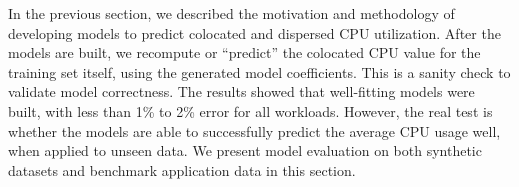 


In the previous section, we described the motivation and methodology
of developing models to predict colocated and 
dispersed CPU utilization.
After the models are built, we recompute or ``predict'' the colocated
CPU value for the training set itself, using the generated model 
coefficients. This is a sanity check to validate model correctness.
The results showed that well-fitting models 
were built, with less than 1\% to 2\% error for all workloads. However, the real test
is whether the models are able to successfully
predict the average CPU usage well, when applied to unseen data.
We present model evaluation on both synthetic datasets and benchmark
application data in this section.


% 
% 
% 




